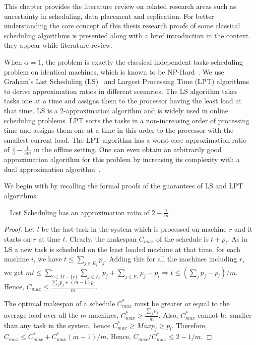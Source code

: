 \label{ch3}
\label{Intro}
This chapter provides the literature review on related research areas such as uncertainty in scheduling, data placement and replication. For better understanding the core concept of this thesis research proofs of some classical scheduling algorithms is presented along with a brief introduction in the context they appear while literature review.


 When $\alpha = 1$, the problem is exactly the classical independent
 tasks scheduling problem on identical machines, which is known to be
 NP-Hard~\cite{GareyJohnson79}. We use Graham's List Scheduling
 (LS)~\cite{Graham66} and Largest Processing Time (LPT)
 algorithms~\cite{Graham69boundson} to derive approximation ratios in
 different scenarios. The LS algorithm takes tasks one at a time and
 assigns them to the processor having the least load at that time. LS is a
 2-approximation algorithm and is widely used in online scheduling
 problems. LPT sorts the tasks in a non-increasing order of processing time and
 assigns them one at a time in this order to the processor with the
 smallest current load. The LPT algorithm has a worst case approximation
 ratio of $\frac{4}{3}-\frac{1}{3m}$ in the offline setting. One can
 even obtain an arbitrarily good approximation algorithm for this problem by increasing
 its complexity with a dual approximation
 algorithm~\cite{Hoch87}. 
 
 We begin with by recalling the formal proofs of the guarantees of LS and LPT algorithms:
 \begin{property}~\cite{Graham66} List Scheduling has an approximation ratio of $2-\frac{1}{m}$.
 \end{property}
 \begin{proof}
 Let $l$ be the last task in the system which is processed on machine $r$ and it starts on $r$ at time $t$. Clearly, the makespan $C_{max}$ of the schedule is $t+p_l$. As in LS a new task is scheduled on the least loaded machine at that time, for each machine $i$, we have $t\leq \sum\limits
 _{j \in E_i}p_j$. Adding this for all the machines including  $r$, we get $m t\leq \sum\limits_{i\in M-\{r\}}\sum\limits_{j \in E_i}p_j +\sum\limits_{j \in E_r}p_j - p_l\Rightarrow t\leq (\sum\limits_{j}p_j - p_l)/ m $. Hence, $C_{max}\leq \frac{\sum_{j}p_j + (m-1)p_l}{m}$.
  
 The optimal makespan of a schedule $C^*_{max}$ must be greater or equal to the average load over all the $m$ machines, $C^*_{max}\geq \frac{\sum_{j}p_j}{m}$. Also, $C^*_{max}$ cannot be smaller than any task in the system, hence $C^*_{max}\geq Max p_j \geq p_l$.  Therefore,  $C_{max} \leq C^*_{max}+C^*_{max}(m-1)/m $. Hence, $C_{max}/C^*_{max} \leq 2-1/m$.
  \end{proof}
  

